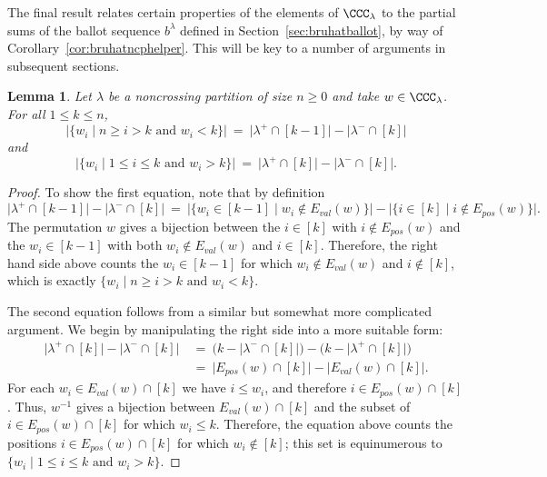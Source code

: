 \documentclass[12pt]{amsart}
\newtheorem{lem}[equation]{Lemma}
\theoremstyle{definition}
\theoremstyle{remark}
\numberwithin{equation}{section}
\renewcommand{\setminus}{-}
\newcommand{\EP}{E_{pos}}
\newcommand{\EV}{E_{val}}
\begin{document}
The final result relates certain properties of the elements of $\CCC_{\lambda}$ to the partial sums of the ballot sequence $b^{\lambda}$ defined in Section~\ref{sec:bruhatballot}, by way of Corollary~\ref{cor:bruhatncphelper}.  This will be key to a number of arguments in subsequent sections.


\begin{lem}
\label{lem:tableautobruhat}
Let $\lambda$ be a noncrossing partition of size $n \ge 0$ and take $w \in \CCC_{\lambda}$.  For all $1 \le k \le n$, 
\[
\big|\{ w_{i} \;|\; \text{$n \ge i > k$ and $w_{i} < k$}\}\big|
\ = \ \big|\lambda^{+} \cap [k-1]\big| - \big|\lambda^{-} \cap [k]\big|
\]
and 
\[
\big|\{ w_{i} \;|\; \text{$1 \le i \le k$ and $w_{i} > k$}\}\big|
\ =\  \big|\lambda^{+} \cap [k]\big| - \big|\lambda^{-} \cap [k]\big|.
\]
\end{lem}
\begin{proof}
To show the first equation, note that by definition
\[
\big|\lambda^{+} \cap [k-1]\big| - \big|\lambda^{-} \cap [k]\big| \ = \ \Big|\big\{ w_{i} \in [k-1] \;|\; w_{i} \notin \EV(w)\big\}\Big| - \Big|\big\{i \in [k] \;|\; i \notin \EP(w)\big\}\Big|.
\]
The permutation $w$ gives a bijection between the $i \in [k]$ with $i \notin \EP(w)$ and the $w_{i} \in [k-1]$ with both $w_{i} \notin \EV(w)$ and $i \in [k]$.  
Therefore, the right hand side above counts the $w_{i} \in [k-1]$ for which $w_{i} \notin \EV(w)$ and $i \notin [k]$, which is exactly $\{ w_{i} \;|\; \text{$n \ge i > k$ and $w_{i} < k$}\}$.

The second equation follows from a similar but somewhat more complicated argument.  We begin by manipulating the right side into a more suitable form:
\begin{align*}
\big|\lambda^{+} \cap [k]\big| - \big|\lambda^{-} \cap [k] \big| \ &= \  \Big(k - \big|\lambda^{-} \cap [k] \big|\Big) - \Big(k - \big|\lambda^{+} \cap [k]\big|\Big) \\
&=\  \big|\EP(w) \cap [k]\big| - \big|\EV(w) \cap [k]\big|.
\end{align*}
For each $w_{i} \in \EV(w) \cap [k]$ we have $i \le w_{i}$, and therefore $i \in \EP(w) \cap [k]$.  Thus, $w^{-1}$ gives a bijection between $\EV(w) \cap [k]$ and the subset of $i \in \EP(w) \cap [k]$ for which $w_{i} \le k$.  Therefore, the equation above counts the positions $i \in \EP(w) \cap [k]$ for which $w_{i} \notin [k]$; this set is equinumerous to $\{ w_{i} \;|\; \text{$1 \le i \le k$ and $w_{i} > k$}\}$.
\end{proof}
\end{document}
